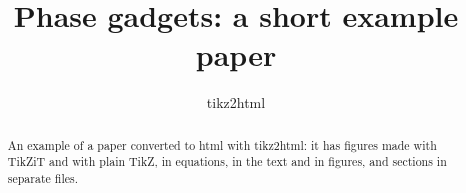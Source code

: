 \documentclass[11pt]{article}
\title{Phase gadgets: a short example paper}
\author{tikz2html}
\begin{document}
\maketitle

\begin{abstract}
  An example of a paper converted to html with tikz2html: it has figures made with TikZiT and with plain TikZ,
  in equations, in the text and in figures, and sections in separate files.
\end{abstract}




\printbibliography
\end{document}
